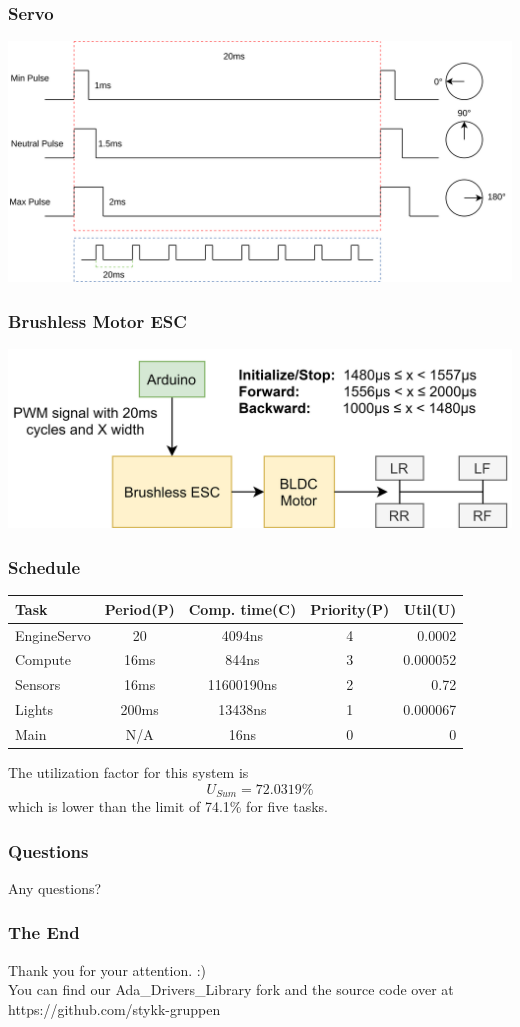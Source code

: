 \documentclass{beamer}
\begin{document}
\begin{frame}
    \frametitle{Servo}
    \includegraphics[width=\linewidth]{img/servo.png}
\end{frame}

\begin{frame}
    \frametitle{Brushless Motor ESC}
    \includegraphics[width=\linewidth]{img/brushless-motor-esc}
\end{frame}

\begin{frame}
    \frametitle{Schedule}
    \begin{center}
        \begin{tabular}{||l c c c|r||}
            \hline
              Task & Period(P) & Comp. time(C) & Priority(P) & Util(U) \\ [0.5ex]
            \hline\hline
              EngineServo & 20 & 4094ns & 4 & 0.0002 \\
            \hline
              Compute & 16ms & 844ns & 3 & 0.000052 \\
            \hline
              Sensors & 16ms & 11600190ns & 2 & 0.72 \\
            \hline
              Lights & 200ms & 13438ns & 1 & 0.000067 \\
            \hline
              Main & N/A & 16ns & 0 & 0 \\ [1ex]
            \hline
        \end{tabular}
    \end{center}
    The utilization factor for this system is
    \begin{equation*}
      U_{Sum} = 72.0319\%
    \end{equation*}
    which is lower than the limit of 74.1\% for five tasks.
\end{frame}

\begin{frame}
    \centering
    \frametitle{Questions}
Any questions?
\end{frame}

\begin{frame}
    \centering
    \frametitle{The End}
    Thank you for your attention. :)\\
    You can find our Ada\_Drivers\_Library fork and the source code over at https://github.com/stykk-gruppen
\end{frame}
\end{document}
